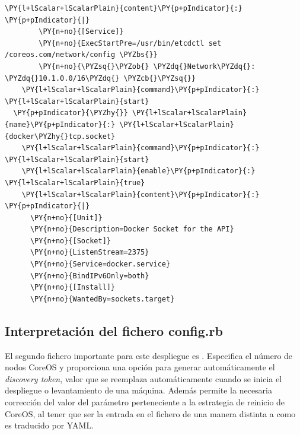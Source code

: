 \begin{codelisting}
\begin{Verbatim}[fontsize=\relsize{-2.5},fontseries=b,commandchars=\\\{\}]
      \PY{l+lScalar+lScalarPlain}{content}\PY{p+pIndicator}{:} \PY{p+pIndicator}{|}
        \PY{n+no}{[Service]}
        \PY{n+no}{ExecStartPre=/usr/bin/etcdctl set /coreos.com/network/config \PYZbs{}}
        \PY{n+no}{\PYZsq{}\PYZob{} \PYZdq{}Network\PYZdq{}: \PYZdq{}10.1.0.0/16\PYZdq{} \PYZcb{}\PYZsq{}}
    \PY{l+lScalar+lScalarPlain}{command}\PY{p+pIndicator}{:} \PY{l+lScalar+lScalarPlain}{start}
  \PY{p+pIndicator}{\PYZhy{}} \PY{l+lScalar+lScalarPlain}{name}\PY{p+pIndicator}{:} \PY{l+lScalar+lScalarPlain}{docker\PYZhy{}tcp.socket}
    \PY{l+lScalar+lScalarPlain}{command}\PY{p+pIndicator}{:} \PY{l+lScalar+lScalarPlain}{start}
    \PY{l+lScalar+lScalarPlain}{enable}\PY{p+pIndicator}{:} \PY{l+lScalar+lScalarPlain}{true}
    \PY{l+lScalar+lScalarPlain}{content}\PY{p+pIndicator}{:} \PY{p+pIndicator}{|}
      \PY{n+no}{[Unit]}
      \PY{n+no}{Description=Docker Socket for the API}
      \PY{n+no}{[Socket]}
      \PY{n+no}{ListenStream=2375}
      \PY{n+no}{Service=docker.service}
      \PY{n+no}{BindIPv6Only=both}
      \PY{n+no}{[Install]}
      \PY{n+no}{WantedBy=sockets.target}
\end{Verbatim}
\end{codelisting}

\subsection{Interpretación del fichero config.rb}

El segundo fichero importante para este despliegue es . Especifica el número de nodos CoreOS y proporciona una opción para generar automáticamente el \textit{discovery token}, valor que se reemplaza automáticamente cuando se inicia el despliegue o levantamiento de una máquina. Además permite la necesaria corrección del valor del parámetro perteneciente a la estrategia de reinicio de CoreOS, al tener que ser la entrada en el fichero  de una manera distinta a como es traducido por YAML.

